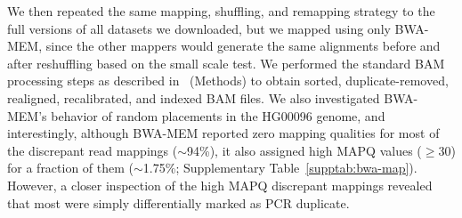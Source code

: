 \documentclass[10pt,a4paper]{article}
\begin{document}
We then repeated the same mapping, shuffling, and remapping strategy to the full versions of all datasets we downloaded, but we mapped using only BWA-MEM, since the other mappers 
would generate the same alignments before and after reshuffling based on the small scale test. We performed the standard BAM processing steps as described 
in~\cite{VanderAuwera2013} (Methods) to obtain sorted, duplicate-removed, realigned, recalibrated, and indexed BAM files. We also investigated BWA-MEM's behavior of random placements in the
HG00096 genome, and interestingly, although BWA-MEM reported zero mapping qualities for 
most of the discrepant read mappings ($\sim$94\%), it also assigned high MAPQ values ($\geq$30) for a fraction of them  ($\sim$1.75\%; Supplementary Table~\ref{supptab:bwa-map}). However, a closer inspection of the high MAPQ discrepant mappings revealed that most were simply differentially marked as PCR duplicate.


\end{document}
